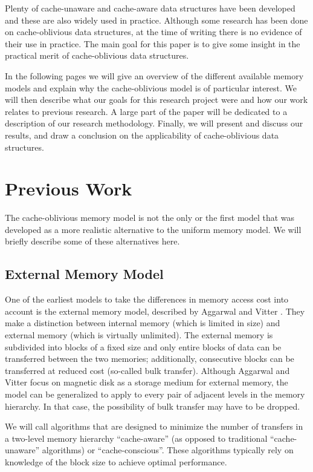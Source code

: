 \documentclass{acm_proc_article-sp}
\begin{document}
Plenty of cache-unaware and cache-aware data structures have been developed and these are also widely used in practice. Although some research has been done on cache-oblivious data structures, at the time of writing there is no evidence of their use in practice. The main goal for this paper is to give some insight in the practical merit of cache-oblivious data structures.

In the following pages we will give an overview of the different available memory models and explain why the cache-oblivious model is of particular interest. We will then describe what our goals for this research project were and how our work relates to previous research.
A large part of the paper will be dedicated to a description of our research methodology. Finally, we will present and discuss our results, and draw a conclusion on the applicability of cache-oblivious data structures.

\section{Previous Work}
The cache-oblivious memory model is not the only or the first model that was developed as a more realistic alternative to the uniform memory model. We will briefly describe some of these alternatives here.

\subsection{External Memory Model}
One of the earliest models to take the differences in memory access cost into account is the external memory model, described by Aggarwal and Vitter \cite{aggarwal1988ioc}. They make a distinction between internal memory (which is limited in size) and external memory (which is virtually unlimited). The external memory is subdivided into blocks of a fixed size and only entire blocks of data can be transferred between the two memories; additionally, consecutive blocks can be transferred at reduced cost (so-called bulk transfer). Although Aggarwal and Vitter focus on magnetic disk as a storage medium for external memory, the model can be generalized to apply to every pair of adjacent levels in the memory hierarchy. In that case, the possibility of bulk transfer may have to be dropped.

We will call algorithms that are designed to minimize the number of transfers in a two-level memory hierarchy ``cache-aware'' (as opposed to traditional ``cache-unaware'' algorithms) or ``cache-conscious''. These algorithms typically rely on knowledge of the block size to achieve optimal performance.
\end{document}
